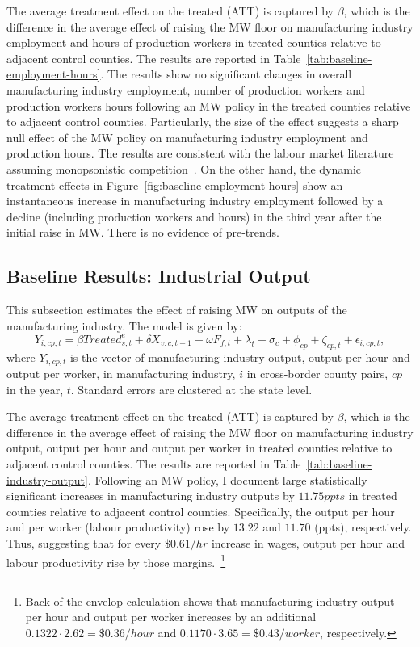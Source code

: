 \documentclass[12pt, english]{article}
\begin{document}
    The average treatment effect on the treated (ATT) is captured by $\beta$, which is the difference in the average effect of raising the MW floor on manufacturing industry employment and hours of production workers in treated counties relative to adjacent control counties. The results are reported in Table~\ref{tab:baseline-employment-hours}. The results show no significant changes in overall manufacturing industry employment, number of production workers and production workers hours following an MW policy in the treated counties relative to adjacent control counties. Particularly, the size of the effect suggests a sharp null effect of the MW policy on manufacturing industry employment and production hours. The results are consistent with the labour market literature assuming monopsonistic competition~\parencite{card2000minimum, aaronson2018industry, cengiz2019effect, wong2019minimum, dustmann2022reallocation}. On the other hand, the dynamic treatment effects in Figure~\ref{fig:baseline-employment-hours} show an instantaneous increase in manufacturing industry employment followed by a decline (including production workers and hours) in the third year after the initial raise in MW. There is no evidence of pre-trends.
    

    \subsection{Baseline Results: Industrial Output}\label{subsec:baseline-results-industrial-output}
    This subsection estimates the effect of raising MW on outputs of the manufacturing industry. The model is given by:
    \begin{equation}
        Y_{i,cp,t} = \beta Treated_{s,t}^e + \delta X_{v,c,t-1} + \omega F_{f,t} + \lambda_{t} + \sigma_{c} + \phi_{cp} + \zeta_{cp,t} + \epsilon_{i,cp,t},\label{eq:baseline-output}
    \end{equation}
    where $Y_{i,cp,t}$ is the vector of manufacturing industry output, output per hour and output per worker, in manufacturing industry, $i$ in cross-border county pairs, $cp$ in the year, $t$. Standard errors are clustered at the state level.
    

    The average treatment effect on the treated (ATT) is captured by $\beta$, which is the difference in the average effect of raising the MW floor on manufacturing industry output, output per hour and output per worker in treated counties relative to adjacent control counties. The results are reported in Table~\ref{tab:baseline-industry-output}. Following an MW policy, I document large statistically significant increases in manufacturing industry outputs by $11.75ppts$ in treated counties relative to adjacent control counties. Specifically, the output per hour and per worker (labour productivity) rose by $13.22$ and $11.70$ (ppts), respectively. Thus, suggesting that for every $\$0.61/hr$ increase in wages, output per hour and labour productivity rise by those margins.~\footnote{\tiny Back of the envelop calculation shows that manufacturing industry output per hour and output per worker increases by an additional $0.1322 \cdot 2.62 = \$0.36/hour$ and $0.1170 \cdot 3.65 = \$0.43/worker$, respectively.}
\end{document}
